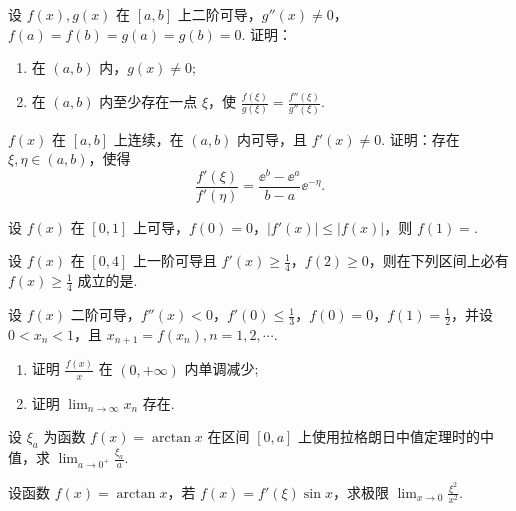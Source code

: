 	\begin{ti}
		设 $f(x), g(x)$ 在 $[a,b]$ 上二阶可导，$g''(x) \ne 0$，$f(a) = f(b) = g(a) = g(b) = 0$. 证明：
		\begin{enumerate}
			\item 在 $(a,b)$ 内，$g(x) \ne 0$;
			\item 在 $(a,b)$ 内至少存在一点 $\xi$，使 $\frac{f(\xi)}{g(\xi)} = \frac{f''(\xi)}{g''(\xi)}$.
		\end{enumerate}
	\end{ti}

	\begin{ti}
		$f(x)$ 在 $[a,b]$ 上连续，在 $(a,b)$ 内可导，且 $f'(x) \ne 0$. 证明：存在 $\xi, \eta \in (a,b)$，使得
		\[
			\frac{f'(\xi)}{f'(\eta)} = \frac{\ee^{b} - \ee^{a}}{b - a} \ee^{-\eta}.
		\]
	\end{ti}

	\begin{ti}
		设 $f(x)$ 在 $[0,1]$ 上可导，$f(0) = 0$，$\left| f'(x) \right| \leq \left| f(x) \right|$，则 $f(1) = $.
	\end{ti}

	\begin{ti}
		设 $f(x)$ 在 $[0,4]$ 上一阶可导且 $f'(x) \geq \frac{1}{4}$，$f(2) \geq 0$，则在下列区间上必有 $f(x) \geq \frac{1}{4}$ 成立的是\kuo.

		\fourch{$[0,1]$}{$[1,2]$}{$[2,3]$}{$[3,4]$}
	\end{ti}

	\begin{ti}
		设 $f(x)$ 二阶可导，$f''(x) < 0$，$f'(0) \leq \frac{1}{3}$，$f(0) = 0$，$f(1) = \frac{1}{2}$，并设 $0 < x_{n} < 1$，且 $x_{n+1} = f(x_{n}), n = 1,2,\cdots$.
		\begin{enumerate}
			\item 证明 $\frac{f(x)}{x}$ 在 $(0,+\infty)$ 内单调减少;
			\item 证明 $\lim_{n \to \infty} x_{n}$ 存在.
		\end{enumerate}
	\end{ti}

	\begin{ti}
		设 $\xi_{a}$ 为函数 $f(x) = \arctan x$ 在区间 $[0,a]$ 上使用拉格朗日中值定理时的中值，求 $\lim_{a \to 0^{+}} \frac{\xi_{a}}{a}$.
	\end{ti}

	\begin{ti}
		设函数 $f(x) = \arctan x$，若 $f(x) = f'(\xi) \sin x$，求极限 $\lim_{x \to 0} \frac{\xi^{2}}{x^{2}}$.
	\end{ti}

